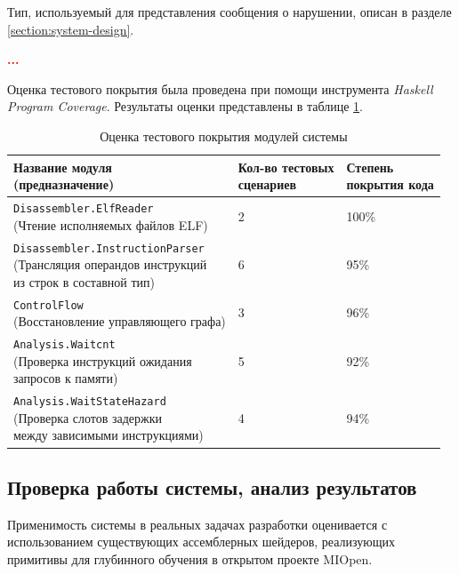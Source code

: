 \documentclass[a4paper,14pt]{extarticle}
\newcommand{\todo}[1]{\textbf{\textcolor{red}{#1}}}
\begin{document}
{Тип, используемый для представления сообщения о нарушении, описан в разделе
\ref{section:system-design}.

\todo{...}

Оценка тестового покрытия была проведена при помощи инструмента \textit{Haskell Program Coverage}.
Результаты оценки представлены в таблице \ref{table:test-coverage}.

\begin{table}[H]
\caption{Оценка тестового покрытия модулей системы}
\label{table:test-coverage}
\begin{tabular}{|l|l|l|}
\hline
\thead{Название модуля \\ (предназначение)} & \thead{Кол-во тестовых \\ сценариев} & \thead{Степень \\ покрытия кода} \\\hline
\makecell[l]{\texttt{Disassembler.ElfReader}\\[2mm] (Чтение исполняемых файлов ELF)} & 2 & 100\% \\\hline
\makecell[l]{\texttt{Disassembler.InstructionParser}\\[2mm] (Трансляция операндов инструкций\\из строк в составной тип)} & 6 & 95\% \\\hline
\makecell[l]{\texttt{ControlFlow}\\[2mm] (Восстановление управляющего графа)} & 3 & 96\% \\\hline
  \makecell[l]{\texttt{Analysis.Waitcnt}\\[2mm] (Проверка инструкций ожидания\\запросов к памяти)} & 5 & 92\% \\\hline
\makecell[l]{\texttt{Analysis.WaitStateHazard}\\[2mm] (Проверка слотов задержки\\между зависимыми инструкциями)} & 4 & 94\% \\\hline
\end{tabular}
\end{table}

\subsection{Проверка работы системы, анализ результатов}

Применимость системы в реальных задачах разработки оценивается с использованием
существующих ассемблерных шейдеров, реализующих примитивы для глубинного обучения
в открытом проекте MIOpen\cite{miopen}.

}
\end{document}
